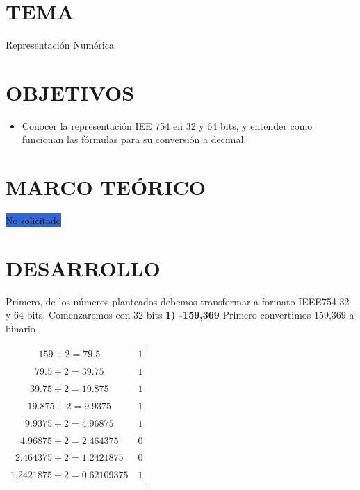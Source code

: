 \documentclass[12pt]{article}
\begin{document}
\section*{TEMA}
Representación Numérica

\vspace{0.5cm}

\section*{OBJETIVOS}
\begin{itemize}
    \item Conocer la representación IEE 754 en 32 y 64 bits, y entender como funcionan las fórmulas para su conversión a decimal.
\end{itemize}

\vspace{0.5cm}

\section*{MARCO TEÓRICO}
\colorbox{highlight}{No solicitado} 

\vspace{0.5cm}

\section*{DESARROLLO}
Primero, de los números planteados debemos transformar a formato IEEE754 32 y 64 bits. Comenzaremos con 32 bits
\newline\newline
\large{\textbf{1) -159,369}}
\normalsize\newline
Primero convertimos 159,369 a binario
\begin{center}
    \begin{tabular}{|c|c|}
        \hline
        $159 \div 2 = 79.5$ & $1$\\
        $79.5 \div 2 = 39.75$ & $1$\\
        $39.75 \div 2 = 19.875$ & $1$\\
        $19.875 \div 2 = 9.9375$ & $1$\\
        $9.9375 \div 2 = 4.96875$ & $1$\\
        $4.96875 \div 2 = 2.464375$ & $0$\\
        $2.464375 \div 2 = 1.2421875$ & $0$\\
        $1.2421875 \div 2 = 0.62109375$ & $1$\\
        \hline
      \end{tabular} 
\end{center}
\end{document}
